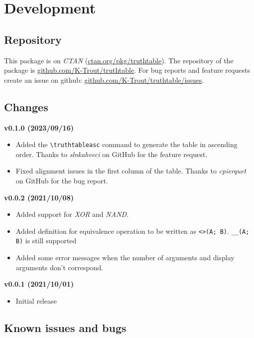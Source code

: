 \documentclass[a4paper]{article}
\begin{document}
\newpage

\section{Development}

\subsection{Repository}

This package is on \emph{CTAN} (\href{https://ctan.org/pkg/truthtable}{ctan.org/pkg/truthtable}). The repository of the package is \href{https://github.com/K-Trout/truthtable}{github.com/K-Trout/truthtable}. For bug reports and feature requests create an issue on github: \href{https://github.com/K-Trout/truthtable/issues}{github.com/K-Trout/truthtable/issues}.

\subsection{Changes}

\textbf{v0.1.0 (2023/09/16)}
\begin{itemize}
    \item Added the \texttt{\textbackslash truthtableasc} command to generate the table in ascending order. Thanks to \emph{slnkahveci} on GitHub for the feature request.
    \item Fixed alignment issues in the first column of the table. Thanks to \emph{cpierquet} on GitHub for the bug report.
\end{itemize}
\textbf{v0.0.2 (2021/10/08)}

\begin{itemize}
    \item Added support for \emph{XOR} and \emph{NAND}.
    \item Added definition for equivalence operation to be written as \texttt{<>(A; B)}.  \texttt{\_\_(A; B)} is still supported
    \item Added some error messages when the number of arguments and display arguments don't correspond.
\end{itemize}
\textbf{v0.0.1 (2021/10/01)}

\begin{itemize}
    \item Initial release
\end{itemize}

\subsection{Known issues and bugs}
\end{document}
